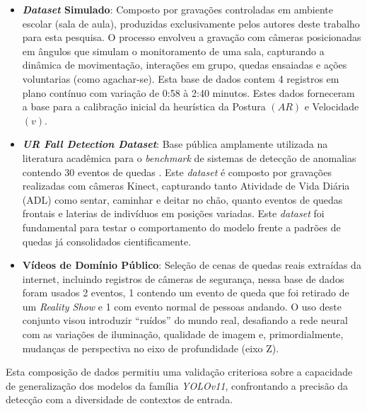 \documentclass[12pt]{article}
\begin{document}
\begin{itemize}

    \item \textbf{\textit{Dataset} Simulado}: Composto por gravações controladas em ambiente escolar
    (sala de aula), produzidas exclusivamente pelos autores deste trabalho para esta pesquisa. O
    processo envolveu a gravação com câmeras posicionadas em ângulos que simulam o monitoramento de
    uma sala, capturando a dinâmica de movimentação, interações em grupo, quedas ensaiadas e ações
    voluntarias (como agachar-se). Esta base de dados contem 4 registros em plano contínuo com 
    variação de 0:58 à 2:40 minutos. Estes dados forneceram a base para a calibração inicial da 
    heurística da Postura $(AR)$ e Velocidade $(v)$.
    \\
    \item \textbf{\textit{UR Fall Detection Dataset}}: Base pública amplamente utilizada na literatura 
    acadêmica para o \textit{benchmark} de sistemas de detecção de anomalias contendo 30 eventos
    de quedas \cite{kwolek2014human}. Este \textit{dataset} é composto por gravações realizadas com
    câmeras Kinect, capturando tanto Atividade de Vida Diária (ADL) como sentar, caminhar e deitar no
    chão, quanto eventos de quedas frontais e laterias de indivíduos em posições variadas. Este
    \textit{dataset} foi fundamental para testar o comportamento do modelo frente a padrões de quedas
    já consolidados cientificamente.
    \\
    \item \textbf{Vídeos de Domínio Público}: Seleção de cenas de quedas reais extraídas da internet,
    incluindo registros de câmeras de segurança, nessa base de dados foram usados 2 eventos, 1 contendo
    um evento de queda  que foi retirado de um \textit{Reality Show} e 1 com evento normal de pessoas 
    andando. O uso deste conjunto visou introduzir ``ruídos'' do mundo real, desafiando a rede neural 
    com as variações de iluminação, qualidade de imagem e, primordialmente, mudanças de perspectiva 
    no eixo de profundidade (eixo Z).    
    
\end{itemize}

Esta composição de dados permitiu uma validação criteriosa sobre a capacidade de generalização dos modelos
da família \textit{YOLOv11}, confrontando a precisão da detecção com a diversidade de contextos de entrada.
\end{document}
